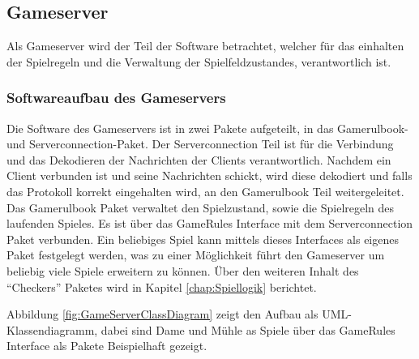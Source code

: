 \documentclass[12pt,a4paper,bibliography=totocnumbered,listof=totocnumbered]{article}
\begin{document}
\subsection{Gameserver}
Als Gameserver wird der Teil der Software betrachtet, welcher für das einhalten der Spielregeln und die Verwaltung der Spielfeldzustandes, 
verantwortlich ist. 

\subsubsection{Softwareaufbau des Gameservers}
Die Software des Gameservers ist in zwei Pakete aufgeteilt, in das Gamerulbook- und Serverconnection-Paket.
Der Serverconnection Teil ist für die Verbindung und das Dekodieren der Nachrichten der Clients verantwortlich.
Nachdem ein Client verbunden ist und seine Nachrichten schickt, wird diese dekodiert und falls das Protokoll korrekt eingehalten wird,
an den Gamerulbook Teil weitergeleitet. Das Gamerulbook Paket verwaltet den Spielzustand, sowie die Spielregeln des laufenden Spieles.
Es ist über das GameRules Interface mit dem Serverconnection Paket verbunden. Ein beliebiges Spiel kann mittels dieses Interfaces
als eigenes Paket festgelegt werden, was zu einer Möglichkeit führt den Gameserver um beliebig viele Spiele erweitern zu können.
Über den weiteren Inhalt des "`Checkers"' Paketes wird in Kapitel \ref{chap:Spiellogik} berichtet.

Abbildung \ref{fig:GameServerClassDiagram} zeigt den Aufbau als UML-Klassendiagramm, dabei sind Dame und Mühle as Spiele über das
GameRules Interface als Pakete Beispielhaft gezeigt. 
\end{document}
